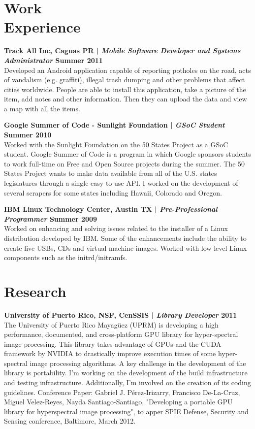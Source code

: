 \documentclass[margin,line]{res}
\begin{document}
\begin{resume}
\section{\sc Work \\Experience}

{\bf Track All Inc, Caguas PR | {\em Mobile Software Developer and Systems Administrator} \hfill {\bf Summer 2011 \\} }
\vspace{-.01cm}
Developed an Android application capable of reporting potholes on the road, acts of vandalism (e.g. graffiti), illegal trash dumping and other problems that affect cities worldwide. People are able to install this application, take a picture of the item, add notes and other information. Then they can upload the data and view a map with all the items.

{\bf Google Summer of Code - Sunlight Foundation | {\em GSoC Student} \hfill {\bf Summer 2010 \\} }
\vspace{-.01cm}
Worked with the Sunlight Foundation on the 50 States Project as a GSoC student. Google Summer of Code is a program in which Google sponsors students to work full-time on Free and Open Source projects during the summer. The 50 States Project wants to make data available from all of the U.S. states legislatures through a single easy to use API. I worked on the development of several scrapers for some states including Hawaii, Colorado and Oregon.


{\bf IBM Linux Technology Center, Austin TX | {\em Pre-Professional Programmer} \hfill {\bf Summer 2009 \\} }
\vspace{-.01cm}
Worked on enhancing and solving issues related to the installer of a Linux distribution developed by IBM. Some of the enhancements include the ability to create live USBs, CDs and virtual machine images. Worked with low-level Linux components such as the initrd/initramfs.

\section{\sc Research}

{\bf University of Puerto Rico, NSF, CenSSIS  | {\em Library Developer} \hfill {\bf 2011 \\} }
\vspace{-.01cm}
The University of Puerto Rico Mayagüez (UPRM) is developing a high performance, documented, and cross-platform GPU library for hyper-spectral image processing. This library takes advantage of GPUs and the CUDA framework by NVIDIA to drastically improve execution times of some hyper-spectral image processing algorithms. A key challenge in the development of the library is portability. I'm working on the development of the build infrastructure and testing infrastructure. Additionally, I'm involved on the creation of its coding guidelines. Conference Paper: Gabriel J. Pérez-Irizarry, Francisco De-La-Cruz, Miguel Velez-Reyes, Nayda Santiago-Santiago, "Developing a portable GPU library for hyperspectral image processing", to apper  SPIE Defense, Security and Sensing conference, Baltimore, March 2012.


\end{resume}
\end{document}
